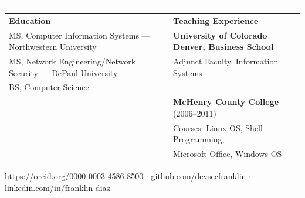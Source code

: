\documentclass[10pt]{article}
\begin{document}
\vspace{0.15in}

\noindent\rule{\linewidth}{0.4pt}
\vspace{0.05in}

\noindent\begin{tabularx}{\linewidth}{@{}>{\raggedright\arraybackslash}X >{\raggedright\arraybackslash}X @{}}
\textbf{\large Education} & \textbf{\large Teaching Experience} \\[0.1in]
MS, Computer Information Systems --- Northwestern University & \textbf{University of Colorado Denver, Business School} \\
MS, Network Engineering/Network Security --- DePaul University & \quad Adjunct Faculty, Information Systems \\
BS, Computer Science & \\[0.05in]
& \textbf{McHenry County College} (2006--2011) \\
& \quad Courses: Linux OS, Shell Programming, \\
& \quad Microsoft Office, Windows OS \\
\end{tabularx}

\vfill
\noindent\small\href{https://orcid.org/0000-0003-4586-8500}{https://orcid.org/0000-0003-4586-8500} $\cdot$ \href{https://github.com/devsecfranklin}{github.com/devsecfranklin} $\cdot$ \href{https://linkedin.com/in/franklin-diaz}{linkedin.com/in/franklin-diaz}
\end{document}
